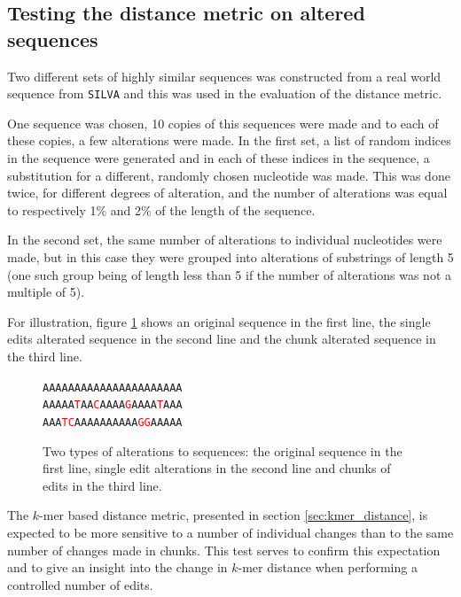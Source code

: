 \subsection{Testing the distance metric on altered sequences}
\label{sec:altered_sequences}

Two different sets of highly similar sequences was constructed from a real
world sequence from \texttt{SILVA} and this was used in the evaluation of the
distance metric.

One sequence was chosen, 10 copies of this sequences were made and to each of
these copies, a few alterations were made. In the first set, a list of random
indices in the sequence were generated and in each of these indices in the
sequence, a substitution for a different, randomly chosen nucleotide was made.
This was done twice, for different degrees of alteration, and the number of
alterations was equal to respectively 1\% and 2\% of the length of the
sequence.

In the second set, the same number of alterations to individual nucleotides
were made, but in this case they were grouped into alterations of substrings of
length 5 (one such group being of length less than 5 if the number of
alterations was not a multiple of 5).

For illustration, figure \ref{fig:alterations} shows an original sequence in
the first line, the single edits alterated sequence in the second line and the
chunk alterated sequence in the third line.

\newcommand{\tc}[1]{\textcolor{red}{#1}}
\begin{figure}[H]
  \centering
  \texttt{AAAAAAAAAAAAAAAAAAAAAA} \\
  \texttt{AAAAA\tc{T}AA\tc{C}AAAA\tc{G}AAAA\tc{T}AAA} \\
  \texttt{AAA\tc{TC}AAAAAAAAAA\tc{GG}AAAAA}
  \caption{Two types of alterations to sequences: the original sequence in the
    first line, single edit alterations in the second line and chunks of edits
    in the third line.}
  \label{fig:alterations}
\end{figure}

The $k$-mer based distance metric, presented in section
\ref{sec:kmer_distance}, is expected to be more sensitive to a number of
individual changes than to the same number of changes made in chunks. This test
serves to confirm this expectation and to give an insight into the change in
$k$-mer distance when performing a controlled number of edits.

